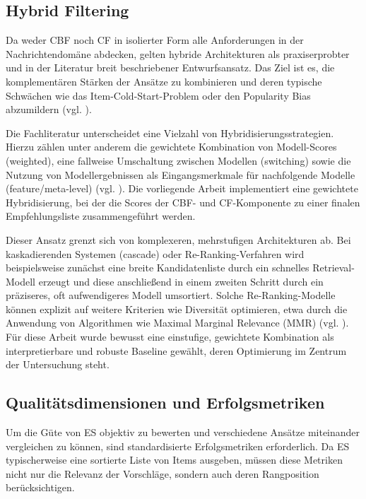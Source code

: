 \subsection{Hybrid Filtering}
\label{sec:hybrid}
Da weder \ac{CBF} noch \ac{CF} in isolierter Form alle Anforderungen in der Nachrichtendomäne abdecken, 
gelten hybride Architekturen als praxiserprobter und in der Literatur breit beschriebener Entwurfsansatz. 
Das Ziel ist es, die komplementären Stärken der Ansätze zu kombinieren und deren typische Schwächen 
wie das Item-Cold-Start-Problem oder den Popularity Bias abzumildern 
(vgl. \cite{burke_hybrid_2002,wu_personalized_2022,raza_news_2020}).

Die Fachliteratur unterscheidet eine Vielzahl von Hybridisierungsstrategien. Hierzu zählen unter anderem 
die gewichtete Kombination von Modell-Scores (weighted), eine fallweise Umschaltung zwischen Modellen 
(switching) sowie die Nutzung von Modellergebnissen als Eingangsmerkmale für nachfolgende Modelle 
(feature/meta-level) (vgl. \cite{burke_hybrid_2002}). 
Die vorliegende Arbeit implementiert eine gewichtete Hybridisierung, bei der die Scores der 
\ac{CBF}- und \ac{CF}-Komponente zu einer finalen Empfehlungsliste zusammengeführt werden.

Dieser Ansatz grenzt sich von komplexeren, mehrstufigen Architekturen ab. Bei kaskadierenden 
Systemen (cascade) oder Re-Ranking-Verfahren wird beispielsweise zunächst eine breite Kandidatenliste 
durch ein schnelles Retrieval-Modell erzeugt und diese anschließend in einem zweiten Schritt durch 
ein präziseres, oft aufwendigeres Modell umsortiert. Solche Re-Ranking-Modelle können explizit auf 
weitere Kriterien wie Diversität optimieren, etwa durch die Anwendung von Algorithmen wie 
Maximal Marginal Relevance (MMR) (vgl. \cite{Carbonell_mmr_1998}). Für diese Arbeit wurde bewusst 
eine einstufige, gewichtete Kombination als interpretierbare und robuste Baseline gewählt, deren 
Optimierung im Zentrum der Untersuchung steht.

\subsection{Qualitätsdimensionen und Erfolgsmetriken}
Um die Güte von \ac{ES} objektiv zu bewerten und verschiedene 
Ansätze miteinander vergleichen zu können, sind standardisierte 
Erfolgsmetriken erforderlich. Da \ac{ES} typischerweise eine sortierte 
Liste von Items ausgeben, müssen diese Metriken nicht nur die Relevanz der 
Vorschläge, sondern auch deren Rangposition berücksichtigen.

